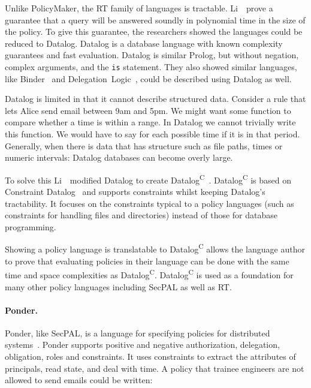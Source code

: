 \documentclass[thesis.tex]{subfiles}
\begin{document}
Unlike PolicyMaker, the RT family of languages is tractable. Li~\etal~prove a
guarantee that a query will be answered soundly in polynomial time in the size
of the policy. To give this guarantee, the researchers showed the languages
could be reduced to Datalog. Datalog is a database language with known
complexity guarantees and fast evaluation. Datalog is similar Prolog, but
without negation, complex arguments, and the \texttt{is} statement. They also
showed similar languages, like Binder~\cite{detreville_binder_2002} and
Delegation~Logic~\cite{li_delegation_2003,li_practically_2000}, could be
described using Datalog as well.

Datalog is limited in that it cannot describe structured data. Consider a rule
that lets Alice send email between 9am and 5pm. We might want some function to
compare whether a time is within a range. In Datalog we cannot trivially write
this function. We would have to say for each possible time if it is in that
period. Generally, when there is data that has structure such as file paths,
times or numeric intervals: Datalog databases can become overly large.

To solve this Li~\etal{}~modified Datalog to create
Datalog\textsuperscript{C}~\cite{li_datalog_2003}. Datalog\textsuperscript{C}
is based on Constraint
Datalog~\cite{revesz_constraint_1995,revesz_safe_1998} and supports
constraints whilst keeping Datalog's tractability. It focuses on the
constraints typical to a policy languages (such as constraints for
handling files and directories) instead of those for database
programming.

Showing a policy language is translatable to Datalog\textsuperscript{C} allows
the language author to prove that evaluating policies in their language can be
done with the same time and space complexities as Datalog\textsuperscript{C}.
Datalog\textsuperscript{C} is used as a foundation for many other policy
languages including SecPAL as well as RT.

\paragraph*{Ponder.}
Ponder, like SecPAL, is a language for specifying policies for distributed
systems~\cite{damianou_ponder_2001}. Ponder supports positive and negative
authorization, delegation, obligation, roles and constraints. It uses
constraints to extract the attributes of principals, read state, and deal with
time. A policy that trainee engineers are not allowed to send emails could be
written:
\end{document}
